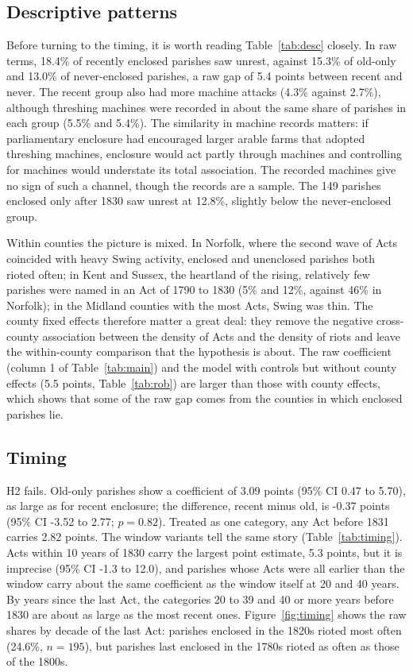 \documentclass[11pt,a4paper]{article}
\begin{document}
\subsection{Descriptive patterns}
Before turning to the timing, it is worth reading Table~\ref{tab:desc} closely. In raw terms, 18.4\% of recently enclosed parishes saw unrest, against 15.3\% of old-only and 13.0\% of never-enclosed parishes, a raw gap of 5.4 points between recent and never. The recent group also had more machine attacks (4.3\% against 2.7\%), although threshing machines were recorded in about the same share of parishes in each group (5.5\% and 5.4\%). The similarity in machine records matters: if parliamentary enclosure had encouraged larger arable farms that adopted threshing machines, enclosure would act partly through machines and controlling for machines would understate its total association. The recorded machines give no sign of such a channel, though the records are a sample. The 149 parishes enclosed only after 1830 saw unrest at 12.8\%, slightly below the never-enclosed group.

Within counties the picture is mixed. In Norfolk, where the second wave of Acts coincided with heavy Swing activity, enclosed and unenclosed parishes both rioted often; in Kent and Sussex, the heartland of the rising, relatively few parishes were named in an Act of 1790 to 1830 (5\% and 12\%, against 46\% in Norfolk); in the Midland counties with the most Acts, Swing was thin. The county fixed effects therefore matter a great deal: they remove the negative cross-county association between the density of Acts and the density of riots and leave the within-county comparison that the hypothesis is about. The raw coefficient (column 1 of Table~\ref{tab:main}) and the model with controls but without county effects (5.5 points, Table~\ref{tab:rob}) are larger than those with county effects, which shows that some of the raw gap comes from the counties in which enclosed parishes lie.

\subsection{Timing}
H2 fails. Old-only parishes show a coefficient of 3.09 points (95\% CI 0.47 to 5.70), as large as for recent enclosure; the difference, recent minus old, is -0.37 points (95\% CI -3.52 to 2.77; $p=0.82$). Treated as one category, any Act before 1831 carries 2.82 points. The window variants tell the same story (Table~\ref{tab:timing}). Acts within 10 years of 1830 carry the largest point estimate, 5.3 points, but it is imprecise (95\% CI -1.3 to 12.0), and parishes whose Acts were all earlier than the window carry about the same coefficient as the window itself at 20 and 40 years. By years since the last Act, the categories 20 to 39 and 40 or more years before 1830 are about as large as the most recent ones. Figure~\ref{fig:timing} shows the raw shares by decade of the last Act: parishes enclosed in the 1820s rioted most often (24.6\%, $n=195$), but parishes last enclosed in the 1780s rioted as often as those of the 1800s.
\end{document}
